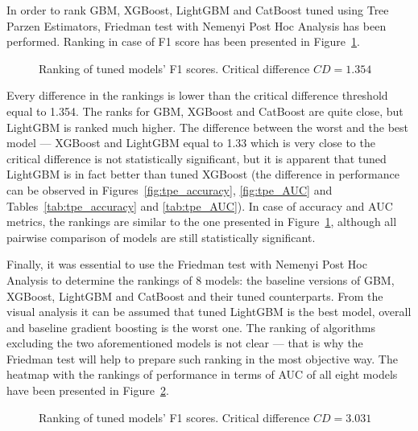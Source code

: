 \documentclass[magisterska, english]{pwr_wmat_praca_dyplomowa}
\theoremstyle{plain}
\numberwithin{theorem}{chapter}
\theoremstyle{definition}
\numberwithin{theorem}{chapter}
\newcommand{\gbm}{GBM, XGBoost, LightGBM and CatBoost }
\begin{document}
In order to rank \gbm tuned using Tree Parzen Estimators, Friedman test with Nemenyi Post Hoc Analysis has been performed. Ranking in case of F1 score has been presented in Figure~\ref{fig:tpe_F1_heatmap}.

\begin{figure}[H]
	\centering
	\caption{Ranking of tuned models' F1 scores. Critical difference $CD = 1.354$}
	\label{fig:tpe_F1_heatmap}
\end{figure}

Every difference in the rankings is lower than the critical difference threshold equal to 1.354. The ranks for GBM, XGBoost and CatBoost are quite close, but LightGBM is ranked much higher. The difference between the worst and the best model --- XGBoost and LightGBM equal to 1.33 which is very close to the critical difference is not statistically significant, but it is apparent that tuned LightGBM is in fact better than tuned XGBoost (the difference in performance can be observed in Figures~\ref{fig:tpe_accuracy}, \ref{fig:tpe_AUC} and Tables~\ref{tab:tpe_accuracy} and \ref{tab:tpe_AUC}). In case of accuracy and AUC metrics, the rankings are similar to the one presented in Figure~\ref{fig:tpe_F1_heatmap}, although all pairwise comparison of models are still statistically significant. 

Finally, it was essential to use the Friedman test with Nemenyi Post Hoc Analysis to determine the rankings of 8 models: the baseline versions of \gbm and their tuned counterparts. From the visual analysis it can be assumed that tuned LightGBM is the best model, overall and baseline gradient boosting is the worst one. The ranking of algorithms excluding the two aforementioned models is not clear --- that is why the Friedman test will help to prepare such ranking in the most objective way. The heatmap with the rankings of performance in terms of AUC of all eight models have been presented in Figure~\ref{fig:no_tuning_tpe_AUC_heatmap}.

\begin{figure}[H]
	\centering
	\caption{Ranking of tuned models' F1 scores. Critical difference $CD = 3.031$}
	\label{fig:no_tuning_tpe_AUC_heatmap}
\end{figure}
\end{document}
